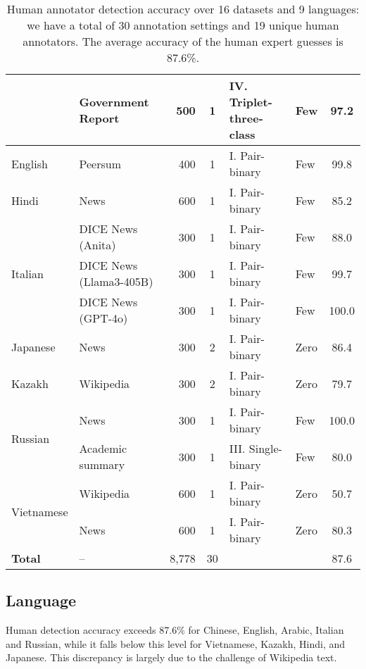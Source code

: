 \begin{table*}[t!]
\begin{tabular}{llr cll c}
    & Government Report & 500 & 1 & IV. Triplet-three-class & Few & 97.2  \\
    \midrule
    English & Peersum & 400 & 1 & I. Pair-binary & Few & 99.8   \\
    \midrule
    Hindi & News & 600 & 1 & I. Pair-binary & Few & 85.2   \\
    \midrule
    \multirow{3}{*}{Italian} 
    & DICE News (Anita) & 300 & 1 & I. Pair-binary & Few & 88.0  \\
    & DICE News (Llama3-405B) & 300 & 1 & I. Pair-binary & Few & 99.7  \\
    & DICE News (GPT-4o) & 300 & 1 & I. Pair-binary & Few & 100.0  \\
    \midrule
    Japanese & News & 300 & 2 & I. Pair-binary & Zero & 86.4  \\
    \midrule
    Kazakh & Wikipedia & 300 & 2 & I. Pair-binary & Zero & 79.7   \\
    \midrule
    \multirow{2}{*}{Russian} 
    & News & 300 & 1 & I. Pair-binary & Few & 100.0   \\
    & Academic summary & 300 & 1 & III. Single-binary & Few & 80.0   \\
    \midrule
    \multirow{2}{*}{Vietnamese} 
    & Wikipedia & 600 & 1 & I. Pair-binary & Zero & 50.7  \\
    & News & 600 & 1 & I. Pair-binary & Zero & 80.3  \\
    \midrule
    \bf Total & -- & 8,778 & 30 & & & 87.6\\
    \bottomrule
    \end{tabular}
    \caption{Human annotator detection accuracy over 16 datasets and 9 languages: we have a total of 30 annotation settings and 19 unique human annotators. The average accuracy of the human expert guesses is 87.6\%.}
    \label{tab:detection-acc}
\end{table*}


\subsection{Language}
Human detection accuracy exceeds 87.6\% for Chinese, English, Arabic, Italian and Russian, while it falls below this level for Vietnamese, Kazakh, Hindi, and Japanese. This discrepancy is largely due to the challenge of Wikipedia text.  

